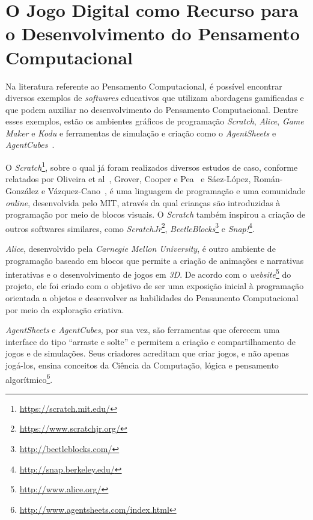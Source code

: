 \section{O Jogo Digital como Recurso para o Desenvolvimento do Pensamento Computacional} \label{sec:jogos_desenvolvimento_pc}

Na literatura referente ao Pensamento Computacional, é possível encontrar diversos exemplos de \textit{softwares} educativos que utilizam abordagens gamificadas e que podem auxiliar no desenvolvimento do Pensamento Computacional. Dentre esses exemplos, estão os ambientes gráficos de programação \textit{Scratch}, \textit{Alice}, \textit{Game Maker} e \textit{Kodu} e ferramentas de simulação e criação como o \textit{AgentSheets} e \textit{AgentCubes}~\cite{grover_computational_2013}. 

O \textit{Scratch}\footnote{\url{https://scratch.mit.edu/}}, sobre o qual já foram realizados diversos estudos de caso, conforme relatados por Oliveira et al~\cite{oliveira_ensino_2014}, Grover, Cooper e Pea~\cite{grover_assessing_2014} e Sáez-López, Román-González e Vázquez-Cano~\cite{saez-lopez_visual_2016}, é uma linguagem de programação e uma comunidade \textit{online}, desenvolvida pelo \acrshort{MIT}, através da qual crianças são introduzidas à programação por meio de blocos visuais. O \textit{Scratch} também inspirou a criação de outros softwares similares, como \textit{ScratchJr}\footnote{\url{https://www.scratchjr.org/}}, \textit{BeetleBlocks}\footnote{\url{http://beetleblocks.com/}} e \textit{Snap!}\footnote{\url{http://snap.berkeley.edu/}}.

\textit{Alice}, desenvolvido pela  \textit{Carnegie Mellon University}, é outro ambiente de programação baseado em blocos que permite a criação de animações e narrativas interativas e o desenvolvimento de jogos em \textit{3D}. De acordo com o \textit{website}\footnote{\url{http://www.alice.org/}} do projeto, ele foi criado com o objetivo de ser uma exposição inicial à programação orientada a objetos e desenvolver as habilidades do Pensamento Computacional por meio da exploração criativa. 

\textit{AgentSheets} e \textit{AgentCubes}, por sua vez, são ferramentas que oferecem uma interface do tipo “arraste e solte” e permitem a criação e compartilhamento de jogos e de simulações. Seus criadores acreditam que criar jogos, e não apenas jogá-los, ensina conceitos da Ciência da Computação, lógica e pensamento algorítmico\footnote{\url{http://www.agentsheets.com/index.html}}.

